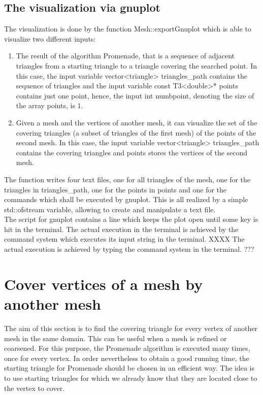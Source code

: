 \documentclass[10pt]{article}
\begin{document}
\subsection{The visualization via gnuplot} \label{visualization}
	The visualization is done by the function {\ttfamily Mesh::exportGnuplot} which is able to visualize two different inputs: 
	\begin{enumerate}
		\item 
		The result of the algorithm Promenade, that is a sequence of adjacent triangles from a starting triangle to a triangle covering the searched point. 
		In this case, the input variable {\ttfamily vector<triangle> triangles\_path} contains the sequence of triangles and the input variable {\ttfamily const T3<double>* points} contains just one point, hence, the input {\ttfamily int numbpoint}, denoting the size of the array {\ttfamily points}, is $ 1 $. 
		\item 
		Given a mesh and the vertices of another mesh, it can visualize the set of the covering triangles (a subset of triangles of the first mesh) of the points of the second mesh. 
		In this case, the input variable {\ttfamily vector<triangle> triangles\_path} contains the covering triangles and {\ttfamily points} stores the vertices of the second mesh. 
	\end{enumerate}
The function writes four text files, one for all triangles of the mesh, one for the triangles in {\ttfamily triangles\_path}, one for the points in {\ttfamily points} and one for the commands which shall be executed by {\ttfamily gnuplot}. This is all realized by a simple {\ttfamily std::ofstream} variable, allowing to create and manipulate a text file. \\
The script for {\ttfamily gnuplot} contains a line which keeps the plot open until some key is hit in the terminal. 
The actual execution in the terminal is achieved by the command {\ttfamily system} which executes its input string in the terminal. XXXX The actual execution is achieved by typing the command {\ttfamily system} in the terminal. ???

\section{Cover vertices of a mesh by another mesh}

The aim of this section is to find the covering triangle for every vertex of another mesh in the same domain. This can be useful when a mesh is refined or coarsened. For this purpose, the Promenade algorithm is executed many times, once for every vertex. In order nevertheless to obtain a good running time, the starting triangle for {\ttfamily Promenade} should be chosen in an efficient way. The idea is to use starting triangles for which we already know that they are located close to the vertex to cover.
\end{document}
